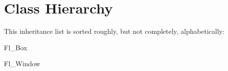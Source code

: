 \section{Class Hierarchy}
This inheritance list is sorted roughly, but not completely, alphabetically\+:\begin{DoxyCompactList}
\item Fl\+\_\+\+Box\begin{DoxyCompactList}
\item {}
\end{DoxyCompactList}
\item Fl\+\_\+\+Window\begin{DoxyCompactList}
\item {}
\end{DoxyCompactList}
\item {}
\item {}
\item {}
\end{DoxyCompactList}
